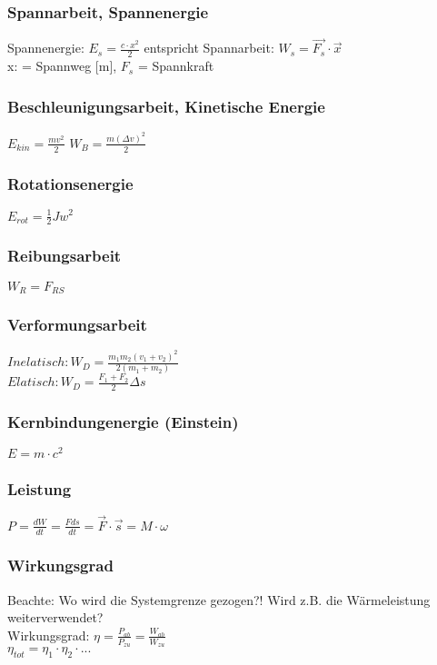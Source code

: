 \subsubsection{Spannarbeit, Spannenergie}
Spannenergie: $E_{s} = \frac{c \cdot x^2}{2}$  entspricht Spannarbeit: $W_{s} = \overrightarrow{F_{s}} \cdot \overrightarrow{x}$ \\
x: = Spannweg [m], $F_{s}$ = Spannkraft


\subsubsection{Beschleunigungsarbeit, Kinetische Energie}
$E_{kin} = \frac{mv^2}{2}$
$W_{B} = \frac{m(\Delta v)^2}{2}$

\subsubsection{Rotationsenergie}
$E_{rot} = \frac{1}{2}Jw^2$

\subsubsection{Reibungsarbeit}
$W_{R} = F_{RS}$

\subsubsection{Verformungsarbeit}
$Inelatisch: W_{D} = \frac{m_{1}m_{2}(v_{1} + v_{2})^2}{2(m_{1} + m_{2})} $ \\
$Elatisch:  W_{D} = \frac{F_{1} + F_{2}}{2}\Delta s$

\subsubsection{Kernbindungenergie (Einstein)}
$E = m \cdot c^2$

\subsubsection{Leistung}
$P = \frac{dW}{dt} = \frac{Fds}{dt} =\overrightarrow{F} \cdot \overrightarrow{s} = M \cdot \omega$

\subsubsection{Wirkungsgrad}
Beachte: Wo wird die Systemgrenze gezogen?! Wird z.B. die Wärmeleistung weiterverwendet? \\
Wirkungsgrad: $\eta = \frac{P_{ab}}{P_{zu}} = \frac{W_{ab}}{W_{zu}}$ \\
$\eta_{tot} = \eta_{1} \cdot \eta_{2}  \cdot ...$

